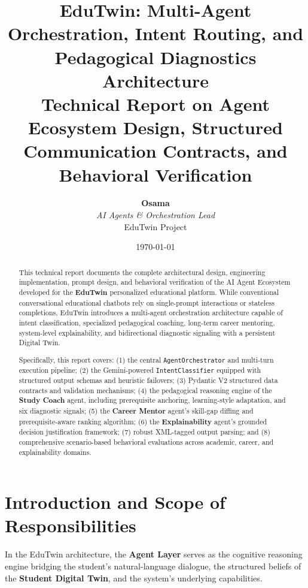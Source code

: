\documentclass[12pt,a4paper]{article}
\title{\textbf{\LARGE EduTwin: Multi-Agent Orchestration, Intent Routing, and Pedagogical Diagnostics Architecture}\\[0.5em]
\large Technical Report on Agent Ecosystem Design, Structured Communication Contracts, and Behavioral Verification}
\author{\textbf{Osama} \\
\textit{AI Agents \& Orchestration Lead} \\
EduTwin Project}
\date{\today}
\begin{document}
\maketitle

\begin{abstract}
\noindent This technical report documents the complete architectural design, engineering implementation, prompt design, and behavioral verification of the AI Agent Ecosystem developed for the \textbf{EduTwin} personalized educational platform. While conventional conversational educational chatbots rely on single-prompt interactions or stateless completions, EduTwin introduces a multi-agent orchestration architecture capable of intent classification, specialized pedagogical coaching, long-term career mentoring, system-level explainability, and bidirectional diagnostic signaling with a persistent Digital Twin. 

Specifically, this report covers: (1) the central \texttt{AgentOrchestrator} and multi-turn execution pipeline; (2) the Gemini-powered \texttt{IntentClassifier} equipped with structured output schemas and heuristic failovers; (3) Pydantic V2 structured data contracts and validation mechanisms; (4) the pedagogical reasoning engine of the \textbf{Study Coach} agent, including prerequisite anchoring, learning-style adaptation, and six diagnostic signals; (5) the \textbf{Career Mentor} agent's skill-gap diffing and prerequisite-aware ranking algorithm; (6) the \textbf{Explainability} agent's grounded decision justification framework; (7) robust XML-tagged output parsing; and (8) comprehensive scenario-based behavioral evaluations across academic, career, and explainability domains.
\end{abstract}

\newpage
\tableofcontents
\newpage

\section{Introduction and Scope of Responsibilities}
\label{sec:intro}

In the EduTwin architecture, the \textbf{Agent Layer} serves as the cognitive reasoning engine bridging the student's natural-language dialogue, the structured beliefs of the \textbf{Student Digital Twin}, and the system's underlying capabilities. 
\end{document}
